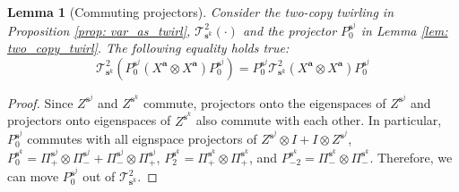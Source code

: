 \documentclass[a4paper,onecolumn,notitlepage,nofootinbib,longbibliography,superscriptaddress, floatfix, pra, aps, 10pt]{revtex4-2}
\newcommand{\vta}{{\bm{a}}}
\newcommand{\vtsj}{{\bm{s}^j}}
\newcommand{\vts}{{\bm{s}}}
\newtheorem{lemma}{Lemma}
\begin{document}
\begin{lemma} [Commuting projectors] \label{lem: twirl_comp}
Consider the two-copy twirling in Proposition \ref{prop: var_as_twirl}, $\mathcal{T}^2_{\vts^k}(\cdot)$ and the projector $P_0^\vtsj$ in Lemma \ref{lem: two_copy_twirl}. The following equality holds true:
\begin{equation}
    \mathcal{T}^2_{\vts^k}(P_0^\vtsj (X^\vta \otimes X^\vta) P_0^\vtsj) =  P_0^\vtsj \mathcal{T}^2_{\vts^k}(X^\vta \otimes X^\vta)P_0^\vtsj
\end{equation}
\end{lemma}
\begin{proof}
Since $Z^\vtsj$ and $Z^{\vts^k}$ commute, projectors onto the eigenspaces of $Z^\vtsj$ and projectors onto eigenspaces of $Z^{\vts^k}$ also commute with each other. In particular, $P_0^\vtsj$ commutes with all eignspace projectors of $Z^{\mathbf{s}^j}\otimes I+I\otimes Z^{\mathbf{s}^j}$, $P_0^{\vts^k} = \Pi_+^{\vtsj}\otimes\Pi_-^{\vtsj} + \Pi_-^{\vtsj}\otimes\Pi_+^{\vtsj}$, $P_2^{\vts^k} = \Pi_+^{\vts^k} \otimes \Pi_+^{\vts^k}$, and $P_{-2}^{\vts^k} = \Pi_-^{\vts^k} \otimes \Pi_-^{\vts^k}$. Therefore, we can move $P_0^{\vtsj}$ out of $\mathcal{T}^2_{\vts^k}$.
\end{proof}
\end{document}
